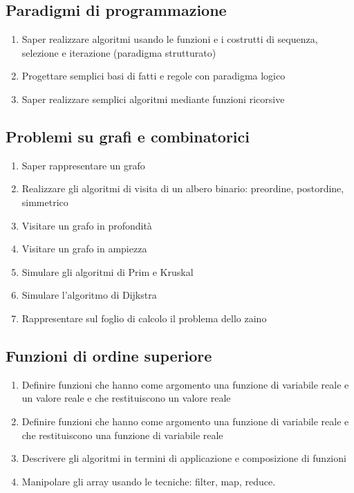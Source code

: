 \documentclass{easychair}
\begin{document}
\subsection[Paradigmi]{Paradigmi di programmazione}

\begin{enumerate}
  \item
    Saper realizzare algoritmi usando le funzioni e 
    i costrutti di sequenza, selezione e iterazione (paradigma strutturato)
  \item
    Progettare semplici basi di fatti e regole con paradigma logico
  \item
    Saper realizzare semplici algoritmi mediante funzioni ricorsive
\end{enumerate}
  
\subsection[Grafi]{Problemi su grafi e combinatorici}

\begin{enumerate}
  \item Saper rappresentare un grafo
  \item
    Realizzare gli algoritmi di visita di un albero binario: preordine,
    postordine, simmetrico %
  \item
    Visitare un grafo in profondità
  \item
    Visitare un grafo in ampiezza
  \item
    Simulare gli algoritmi di Prim e Kruskal
  \item
    Simulare l'algoritmo di Dijkstra
  \item Rappresentare sul foglio di calcolo il problema dello zaino
\end{enumerate}

\subsection[Funzioni di ordine superiore]{Funzioni di ordine superiore}

\begin{enumerate}
  \item
    Definire funzioni che hanno come argomento una funzione di variabile
    reale e un valore reale e che restituiscono un valore reale
  \item
    Definire funzioni che hanno come argomento una funzione di variabile
    reale e che restituiscono una funzione di variabile reale
  \item
    Descrivere gli algoritmi in termini di applicazione e composizione di funzioni
  \item
    Manipolare gli array usando le tecniche: filter, map, reduce.
\end{enumerate}
\end{document}
